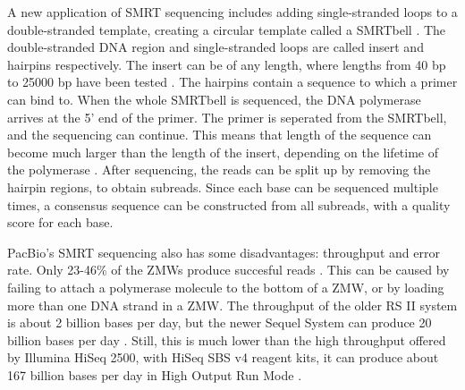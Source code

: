 \documentclass[../main/thesis.tex]{subfiles}
\begin{document}


A new application of SMRT sequencing includes adding single-stranded loops to a double-stranded template, creating a circular template called a SMRTbell \cite{SMRTbell}.
The double-stranded DNA region and single-stranded loops are called insert and hairpins respectively.
The insert can be of any length, where lengths from 40 bp to 25000 bp have been tested \cite{SMRTbell}.
The hairpins contain a sequence to which a primer can bind to.
When the whole SMRTbell is sequenced, the DNA polymerase arrives at the 5' end of the primer.
The primer is seperated from the SMRTbell, and the sequencing can continue.
This means that length of the sequence can become much larger than the length of the insert, depending on the lifetime of the polymerase \cite{pacbio}.
After sequencing, the reads can be split up by removing the hairpin regions, to obtain subreads.
Since each base can be sequenced multiple times, a consensus sequence can be constructed from all subreads, with a quality score for each base.



PacBio's SMRT sequencing also has some disadvantages: throughput and error rate.
Only 23-46\% of the ZMWs produce succesful reads \cite{history_sequencing}.
This can be caused by failing to attach a polymerase molecule to the bottom of a ZMW, or by loading more than one DNA strand in a ZMW.
The throughput of the older RS II system is about 2 billion bases per day, but the newer Sequel System can produce 20 billion bases per day \cite{pacbio_throughput}.
Still, this is much lower than the high throughput offered by Illumina HiSeq 2500, with HiSeq SBS v4 reagent kits, it can produce about 167 billion bases per day in High Output Run Mode \cite{pacbio}.
\end{document}
